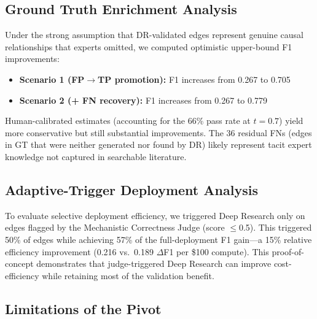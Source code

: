 \subsection{Ground Truth Enrichment Analysis}

Under the strong assumption that DR-validated edges represent genuine causal relationships that experts omitted, we computed optimistic upper-bound F1 improvements:
\begin{itemize}[noitemsep]
    \item \textbf{Scenario 1 (FP$\rightarrow$TP promotion):} F1 increases from 0.267 to 0.705
    \item \textbf{Scenario 2 (+ FN recovery):} F1 increases from 0.267 to 0.779
\end{itemize}

Human-calibrated estimates (accounting for the 66\% pass rate at $t=0.7$) yield more conservative but still substantial improvements. The 36 residual FNs (edges in GT that were neither generated nor found by DR) likely represent tacit expert knowledge not captured in searchable literature.

\subsection{Adaptive-Trigger Deployment Analysis}

To evaluate selective deployment efficiency, we triggered Deep Research only on edges flagged by the Mechanistic Correctness Judge (score $\leq$0.5). This triggered 50\% of edges while achieving 57\% of the full-deployment F1 gain---a 15\% relative efficiency improvement (0.216 vs.\ 0.189 $\Delta$F1 per \$100 compute). This proof-of-concept demonstrates that judge-triggered Deep Research can improve cost-efficiency while retaining most of the validation benefit.

\subsection{Limitations of the Pivot}

